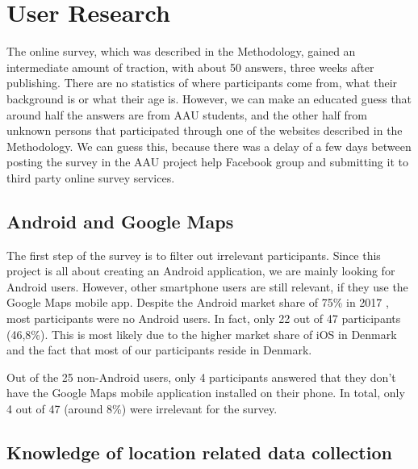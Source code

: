 \documentclass[12p]{article}
\begin{document}
		
		\newpage
		\section{User Research} \label{sec:UserResearch}
		
		The online survey, which was described in the Methodology, gained an intermediate amount of traction, with about 50 answers, three weeks after publishing. There are no statistics of where participants come from, what their background is or what their age is. However, we can make an educated guess that around half the answers are from AAU students, and the other half from unknown persons that participated through one of the websites described in the Methodology. We can guess this, because there was a delay of a few days between posting the survey in the AAU project help Facebook group and submitting it to third party online survey services.
		
		\subsection{Android and Google Maps}
		
		The first step of the survey is to filter out irrelevant participants. Since this project is all about creating an Android application, we are mainly looking for Android users. However, other smartphone users are still relevant, if they use the Google Maps mobile app. Despite the Android market share of 75\% in 2017 \cite{SmartphoneOSMarketShare}, most participants were no Android users. In fact, only 22 out of 47 participants (46,8\%). This is most likely due to the higher market share of iOS in Denmark \cite{SmartphoneOSMarketShareDenmark} and the fact that most of our participants reside in Denmark.
		
		Out of the 25 non-Android users, only 4 participants answered that they don't have the Google Maps mobile application installed on their phone. In total, only 4 out of 47 (around 8\%) were irrelevant for the survey.
		
		\subsection{Knowledge of location related data collection}
	    
\end{document}
